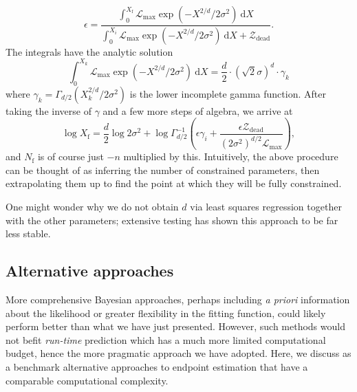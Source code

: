 \documentclass[usenatbib]{mnras}
\newcommand{\Like}{\mathcal{L}}
\begin{document}
\begin{equation}
	\epsilon = \frac{\int_0^{X_\mathrm{f}} \Like_\mathrm{max} \exp\left(-X^{2/d}/2\sigma^2\right)\ \mathrm{d}X}{\int_0^{X_i} \Like_\mathrm{max} \exp\left(-X^{2/d}/2\sigma^2\right)\ \mathrm{d}X + \mathcal{Z}_\mathrm{dead}}.
\end{equation}
The integrals have the analytic solution
\begin{equation}
	\int_0^{X_k} \Like_\mathrm{max} \exp\left(-X^{2/d}/2\sigma^2\right)\ \mathrm{d}X = \frac{d}{2} \cdot \left(\sqrt{2}\sigma\right)^d \cdot \gamma_k
\end{equation}
where $\gamma_k = \Gamma_{d/2}\left(X_k^{2/d}/2\sigma^2\right)$ is the lower incomplete gamma function. After taking the inverse of  $\gamma$ and a few more steps of algebra, we arrive at
\begin{equation}
    \log X_\mathrm{f} = \frac{d}{2}\log 2\sigma^2	+ \log \Gamma^{-1}_{d/2} \left(\epsilon \gamma_i+ \frac{\epsilon\mathcal{Z}_\mathrm{dead}}{ \left( 2\sigma^2 \right)^{d/2}\Like_\mathrm{max}}\right),\label{eq:xf}
\end{equation}
and $N_\mathrm{f}$ is of course just $-n$ multiplied by this. Intuitively, the above procedure can be thought of as inferring the number of constrained parameters, then extrapolating them up to find the point at which they will be fully constrained. 
\par
One might wonder why we do not obtain $d$ via least squares regression together with the other parameters; extensive testing has shown this approach to be far less stable. 

\subsection{Alternative approaches}
More comprehensive Bayesian approaches, perhaps including \textit{a priori} information about the likelihood or greater flexibility in the fitting function, could likely perform better than what we have just presented. However, such methods would not befit \textit{run-time} prediction which has a much more limited computational budget, hence the more pragmatic approach we have adopted. Here, we discuss as a benchmark alternative approaches to endpoint estimation that have a comparable computational complexity. 
\end{document}
